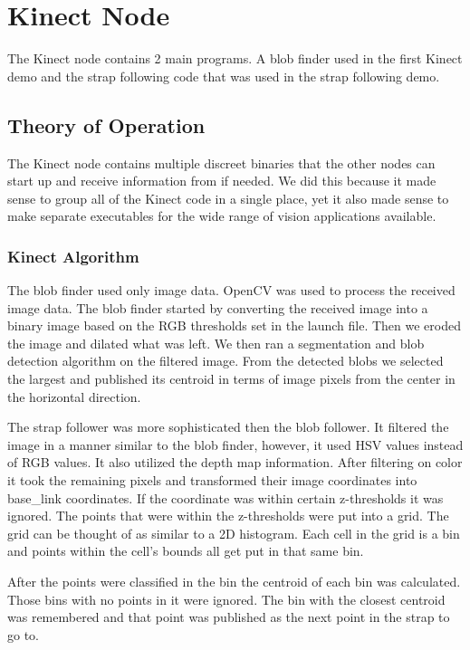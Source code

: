 \section{Kinect Node}

The Kinect node contains 2 main programs. A blob finder used in the first Kinect demo and the strap following code that was used in the strap following demo.

\subsection{Theory of Operation}

The Kinect node contains multiple discreet binaries that the other nodes can start up and receive information from if needed. We did this because it made sense to group all of the Kinect code in a single place, yet it also made sense to make separate executables for the wide range of vision applications available.

\subsubsection{Kinect Algorithm}

The blob finder used only image data. OpenCV was used to process the received image data. The blob finder started by converting the received image into a binary image based on the RGB thresholds set in the launch file. Then we eroded the image and dilated what was left. We then ran a segmentation and blob detection algorithm on the filtered image. From the detected blobs we selected the largest and published its centroid in terms of image pixels from the center in the horizontal direction.

The strap follower was more sophisticated then the blob follower. It filtered the image in a manner similar to the blob finder, however, it used HSV values instead of RGB values. It also utilized the depth map information. After filtering on color it took the remaining pixels and transformed their image coordinates into base\_link coordinates. If the coordinate was within certain z-thresholds it was ignored. The points that were within the z-thresholds were put into a grid. The grid can be thought of as similar to a 2D histogram. Each cell in the grid is a bin and points within the cell's bounds all get put in that same bin.

After the points were classified in the bin the centroid of each bin was calculated. Those bins with no points in it were ignored. The bin with the closest centroid was remembered and that point was published as the next point in the strap to go to.

